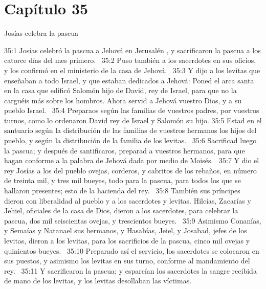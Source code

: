 																																		\section*{Capítulo 35}
																																			Josías celebra la pascua 
																																			
																																			
																																			35:1 Josías celebró la pascua a Jehová en Jerusalén , y sacrificaron la pascua a los catorce días del mes primero.  
																																			35:2 Puso también a los sacerdotes en sus oficios, y los confirmó en el ministerio de la casa de Jehová.  
																																			35:3 Y dijo a los levitas que enseñaban a todo Israel, y que estaban dedicados a Jehová: Poned el arca santa en la casa que edificó Salomón hijo de David, rey de Israel, para que no la carguéis más sobre los hombros. Ahora servid a Jehová vuestro Dios, y a su pueblo Israel.  
																																			35:4 Preparaos según las familias de vuestros padres, por vuestros turnos, como lo ordenaron David rey de Israel y Salomón su hijo. 
																																			35:5 Estad en el santuario según la distribución de las familias de vuestros hermanos los hijos del pueblo, y según la distribución de la familia de los levitas.  
																																			35:6 Sacrificad luego la pascua; y después de santificaros, preparad a vuestros hermanos, para que hagan conforme a la palabra de Jehová dada por medio de Moisés.  
																																			35:7 Y dio el rey Josías a los del pueblo ovejas, corderos, y cabritos de los rebaños, en número de treinta mil, y tres mil bueyes, todo para la pascua, para todos los que se hallaron presentes; esto de la hacienda del rey.  
																																			35:8 También sus príncipes dieron con liberalidad al pueblo y a los sacerdotes y levitas. Hilcías, Zacarías y Jehiel, oficiales de la casa de Dios, dieron a los sacerdotes, para celebrar la pascua, dos mil seiscientas ovejas, y trescientos bueyes.  
																																			35:9 Asimismo Conanías, y Semaías y Natanael sus hermanos, y Hasabías, Jeiel, y Josabad, jefes de los levitas, dieron a los levitas, para los sacrificios de la pascua, cinco mil ovejas y quinientos bueyes.  
																																			35:10 Preparado así el servicio, los sacerdotes se colocaron en sus puestos, y asimismo los levitas en sus turno, conforme al mandamiento del rey.  
																																			35:11 Y sacrificaron la pascua; y esparcían los sacerdotes la sangre recibida de mano de los levitas, y los levitas desollaban las víctimas.  
